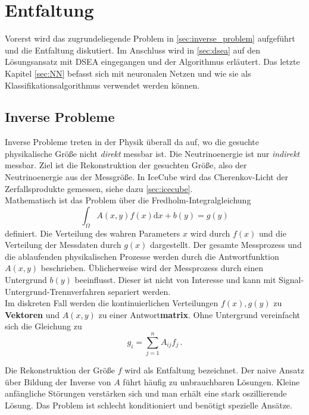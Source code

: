\chapter{Entfaltung}
Vorerst wird das zugrundeliegende Problem in \autoref{sec:inverse_problem} aufgeführt und die Entfaltung diskutiert.
Im Anschluss wird in \autoref{sec:dsea} auf den Lösungsansatz mit DSEA eingegangen und der Algorithmus erläutert.
Das letzte Kapitel \autoref{sec:NN} befasst sich mit neuronalen Netzen und wie sie als Klassifikationsalgorithmus verwendet werden können.

\section{Inverse Probleme} \label{sec:inverse_problem}
Inverse Probleme treten in der Physik überall da auf, wo die gesuchte physikalische Größe nicht \textit{direkt} messbar ist.
Die Neutrinoenergie ist nur \textit{indirekt} messbar.
Ziel ist die Rekonstruktion der gesuchten Größe, also der Neutrinoenergie aus der Messgröße.
In IceCube wird das Cherenkov-Licht der Zerfallsprodukte gemessen, siehe dazu \autoref{sec:icecube}.
\\
Mathematisch ist das Problem über die Fredholm-Integralgleichung\cite{twomey1963numerical} 
\begin{equation}
    \int_{\Omega} A(x,y) f(x) \mathrm{d}x + b(y) = g(y)
\end{equation}
definiert.
Die Verteilung des wahren Parameters $x$ wird durch $f(x)$ und die Verteilung der Messdaten durch $g(x)$ dargestellt.
Der gesamte Messprozess und die ablaufenden physikalischen Prozesse werden durch die Antwortfunktion $A(x,y)$ beschrieben.
Üblicherweise wird der Messprozess durch einen Untergrund $b(y)$ beeinflusst.
Dieser ist nicht von Interesse und kann mit Signal-Untergrund-Trennverfahren separiert werden.
\\
Im diskreten Fall werden die kontinuierlichen Verteilungen $f(x), g(y)$ zu \textbf{Vektoren} und $A(x,y)$ zu einer Antwort\textbf{matrix}.
Ohne Untergrund vereinfacht sich die Gleichung zu
\begin{equation}
    g_i = \sum_{j=1}^{n} A_{ij} f_j \, .
\end{equation}

Die Rekonstruktion der Größe $f$ wird als Entfaltung bezeichnet.
Der naive Ansatz über Bildung der Inverse von $A$ führt häufig zu unbrauchbaren Lösungen.
Kleine anfängliche Störungen verstärken sich und man erhält eine stark oszillierende Lösung.
Das Problem ist schlecht konditioniert und benötigt spezielle Ansätze.

